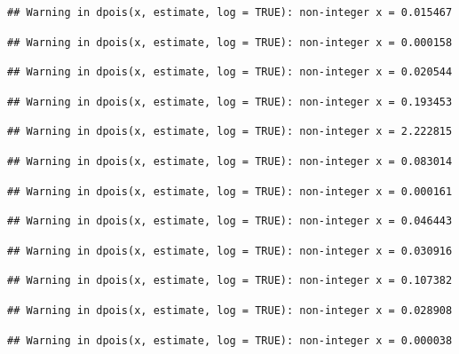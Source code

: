 \documentclass[]{article}
\begin{document}
\begin{verbatim}
## Warning in dpois(x, estimate, log = TRUE): non-integer x = 0.015467
\end{verbatim}

\begin{verbatim}
## Warning in dpois(x, estimate, log = TRUE): non-integer x = 0.000158
\end{verbatim}

\begin{verbatim}
## Warning in dpois(x, estimate, log = TRUE): non-integer x = 0.020544
\end{verbatim}

\begin{verbatim}
## Warning in dpois(x, estimate, log = TRUE): non-integer x = 0.193453
\end{verbatim}

\begin{verbatim}
## Warning in dpois(x, estimate, log = TRUE): non-integer x = 2.222815
\end{verbatim}

\begin{verbatim}
## Warning in dpois(x, estimate, log = TRUE): non-integer x = 0.083014
\end{verbatim}

\begin{verbatim}
## Warning in dpois(x, estimate, log = TRUE): non-integer x = 0.000161
\end{verbatim}

\begin{verbatim}
## Warning in dpois(x, estimate, log = TRUE): non-integer x = 0.046443
\end{verbatim}

\begin{verbatim}
## Warning in dpois(x, estimate, log = TRUE): non-integer x = 0.030916
\end{verbatim}

\begin{verbatim}
## Warning in dpois(x, estimate, log = TRUE): non-integer x = 0.107382
\end{verbatim}

\begin{verbatim}
## Warning in dpois(x, estimate, log = TRUE): non-integer x = 0.028908
\end{verbatim}

\begin{verbatim}
## Warning in dpois(x, estimate, log = TRUE): non-integer x = 0.000038
\end{verbatim}
\end{document}
